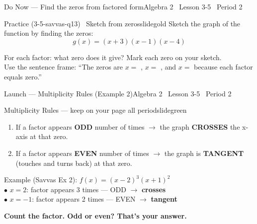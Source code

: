 \documentclass[aspectratio=169, 11pt]{beamer}
\begin{document}

\begin{frame}{Do Now --- Find the zeros from factored form}{Algebra 2 \textperiodcentered\ Lesson 3-5 \textperiodcentered\ Period 2}
\vspace{0.2cm}
\begin{projcard}{Practice (3-5-savvas-q13) \textperiodcentered\ Sketch from zeros}{slidegold}
Sketch the graph of the function by finding the zeros:
\[g(x) = (x+3)(x-1)(x-4)\]

\vspace{0.1cm}
For each factor: what zero does it give? Mark each zero on your sketch.\\
Use the sentence frame: ``The zeros are \(x=\) \underline{\hspace{0.6cm}}, \(x=\) \underline{\hspace{0.6cm}},
and \(x=\) \underline{\hspace{0.6cm}} because each factor equals zero.''
\end{projcard}
\end{frame}

\begin{frame}{Launch --- Multiplicity Rules (Example 2)}{Algebra 2 \textperiodcentered\ Lesson 3-5 \textperiodcentered\ Period 2}
\vspace{0.2cm}
\begin{projcard}{Multiplicity Rules --- keep on your page all period}{slidegreen}
\begin{enumerate}
  \setlength{\itemsep}{0pt}
  \item If a factor appears \textbf{ODD} number of times \(\rightarrow\) the graph \textbf{CROSSES} the x-axis at that zero.
  \item If a factor appears \textbf{EVEN} number of times \(\rightarrow\) the graph is \textbf{TANGENT} (touches and turns back) at that zero.
\end{enumerate}

\vspace{0.1cm}
\small
Example (Savvas Ex 2): \(f(x) = (x-2)^3(x+1)^2\)\\
\hspace*{1em}\(\bullet\) \(x = 2\): factor appears 3 times --- ODD \(\rightarrow\) \textbf{crosses}\\
\hspace*{1em}\(\bullet\) \(x = -1\): factor appears 2 times --- EVEN \(\rightarrow\) \textbf{tangent}

\vspace{0.1cm}
\textcolor{slideaccent}{\textbf{Count the factor. Odd or even? That's your answer.}}
\end{projcard}
\end{frame}
\end{document}
